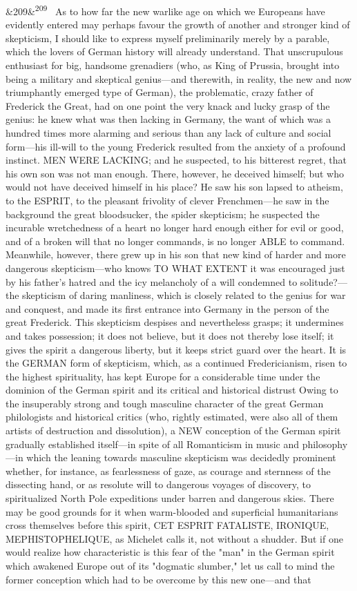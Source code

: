 \documentclass[12pt]{article}
\newcommand{\para}[1][]{\par\noindent\ifx&#1&\else\textsuperscript{\footnotesize #1}~\fi}
\begin{document}
\para[209] As to how far the new warlike age on which we Europeans have evidently entered may perhaps favour the growth of another and stronger kind of skepticism, I should like to express myself preliminarily merely by a parable, which the lovers of German history will already understand. That unscrupulous enthusiast for big, handsome grenadiers (who, as King of Prussia, brought into being a military and skeptical genius---and therewith, in reality, the new and now triumphantly emerged type of German), the problematic, crazy father of Frederick the Great, had on one point the very knack and lucky grasp of the genius: he knew what was then lacking in Germany, the want of which was a hundred times more alarming and serious than any lack of culture and social form---his ill-will to the young Frederick resulted from the anxiety of a profound instinct. MEN WERE LACKING; and he suspected, to his bitterest regret, that his own son was not man enough. There, however, he deceived himself; but who would not have deceived himself in his place? He saw his son lapsed to atheism, to the ESPRIT, to the pleasant frivolity of clever Frenchmen---he saw in the background the great bloodsucker, the spider skepticism; he suspected the incurable wretchedness of a heart no longer hard enough either for evil or good, and of a broken will that no longer commands, is no longer ABLE to command. Meanwhile, however, there grew up in his son that new kind of harder and more dangerous skepticism---who knows TO WHAT EXTENT it was encouraged just by his father's hatred and the icy melancholy of a will condemned to solitude?---the skepticism of daring manliness, which is closely related to the genius for war and conquest, and made its first entrance into Germany in the person of the great Frederick. This skepticism despises and nevertheless grasps; it undermines and takes possession; it does not believe, but it does not thereby lose itself; it gives the spirit a dangerous liberty, but it keeps strict guard over the heart. It is the GERMAN form of skepticism, which, as a continued Fredericianism, risen to the highest spirituality, has kept Europe for a considerable time under the dominion of the German spirit and its critical and historical distrust Owing to the insuperably strong and tough masculine character of the great German philologists and historical critics (who, rightly estimated, were also all of them artists of destruction and dissolution), a NEW conception of the German spirit gradually established itself---in spite of all Romanticism in music and philosophy---in which the leaning towards masculine skepticism was decidedly prominent whether, for instance, as fearlessness of gaze, as courage and sternness of the dissecting hand, or as resolute will to dangerous voyages of discovery, to spiritualized North Pole expeditions under barren and dangerous skies. There may be good grounds for it when warm-blooded and superficial humanitarians cross themselves before this spirit, CET ESPRIT FATALISTE, IRONIQUE, MEPHISTOPHELIQUE, as Michelet calls it, not without a shudder. But if one would realize how characteristic is this fear of the "man" in the German spirit which awakened Europe out of its "dogmatic slumber," let us call to mind the former conception which had to be overcome by this new one---and that 
\end{document}
